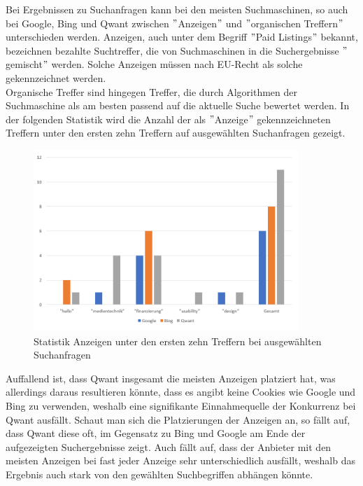 Bei Ergebnissen zu Suchanfragen kann bei den meisten Suchmaschinen, so auch bei Google,
Bing und Qwant zwischen \("\)Anzeigen\("\) und \("\)organischen Treffern\("\) unterschieden werden.
Anzeigen, auch unter dem Begriff \("\)Paid Listings\("\) bekannt, bezeichnen bezahlte Suchtreffer,
die von Suchmaschinen in die Suchergebnisse \("\)gemischt\("\) werden.
Solche Anzeigen müssen nach EU-Recht als solche gekennzeichnet werden.\\
Organische Treffer sind hingegen Treffer, die durch Algorithmen der Suchmaschine als am besten passend auf die aktuelle Suche bewertet werden.
In der folgenden Statistik wird die Anzahl der als \("\)Anzeige\("\) gekennzeichneten Treffern unter den ersten zehn Treffern auf ausgewählten Suchanfragen gezeigt.\cite{LEW18}\\
\begin{figure}[h]
    \centering
    \includegraphics[width=100mm]{images/statistic_adverts}
    \caption{Statistik Anzeigen unter den ersten zehn Treffern bei ausgewählten Suchanfragen}
    \label{fig:statisticAdverts}
\end{figure}
Auffallend ist, dass Qwant insgesamt die meisten Anzeigen platziert hat, was allerdings daraus resultieren könnte,
dass es angibt keine Cookies wie Google und Bing zu verwenden, weshalb eine signifikante Einnahmequelle der Konkurrenz bei Qwant ausfällt.
Schaut man sich die Platzierungen der Anzeigen an, so fällt auf, dass Qwant diese oft,
im Gegensatz zu Bing und Google am Ende der aufgezeigten Suchergebnisse zeigt.
Auch fällt auf, dass der Anbieter mit den meisten Anzeigen bei fast jeder Anzeige sehr unterschiedlich ausfällt,
weshalb das Ergebnis auch stark von den gewählten Suchbegriffen abhängen könnte.\\